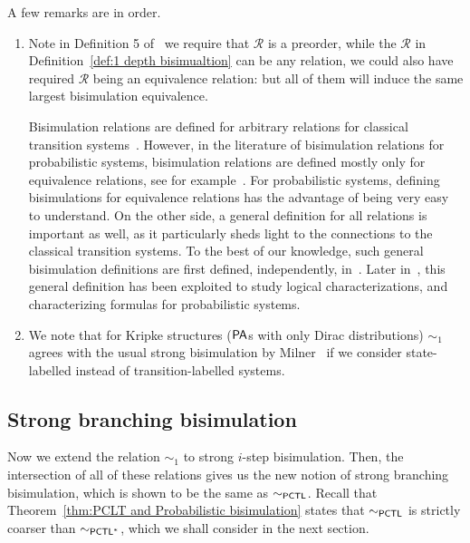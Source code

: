 \documentclass{LMCS}
\newcommand{\PA}{{\sf PA}}
\newcommand{\PCTL}{{\sf PCTL}}
\newcommand{\iBS}[1]{\sim_{#1}}
\newcommand{\EPCTL}{\sim_{\PCTL}}
\newcommand{\EPCTLS}{\sim_{\PCTL^{*}}}
\newcommand{\MC}[1]{\mathcal{#1}}
\begin{document}
\noindent A few remarks are in order.
\begin{enumerate}[(1)]
\item Note in Definition 5 of~\cite{SongZG2011} we require that $\MC{R}$ is a preorder, while the $\MC{R}$ in Definition~\ref{def:1 depth bisimualtion} can be any relation, we could also have required $\MC{R}$ being an equivalence relation: but all of them will induce the same largest bisimulation equivalence.

  Bisimulation relations are defined for arbitrary relations for
  classical transition
  systems~\cite{milner1989communication}. However, in the literature
  of bisimulation relations for probabilistic systems, bisimulation
  relations are defined mostly only for equivalence relations, see for
  example~\cite{LarsenS89,larsen1991bisimulation,Segala-thesis,baier2003comparative,SegalaL95,prakash-book}. For
  probabilistic systems, defining bisimulations for equivalence
  relations has the advantage of being very easy to understand. On
  the other side, a general definition for all relations is important
  as well, as it particularly sheds light to the connections to the
  classical transition systems. To the best of our knowledge, such
  general bisimulation definitions are first defined, independently,
  in~\cite{DesharnaisLT08,lpar08-yuxin-van-glabbeek,lijun-thesis}. Later
  in~\cite{Parma2007LCB,HermannsPSWZ11,SackZ12,Hennessy12}, this general definition
  has been exploited to study logical characterizations, and characterizing formulas 
  for probabilistic systems.
\item We note that for Kripke structures ($\PA$s with only Dirac
  distributions) $\iBS{1}$ agrees with the usual strong bisimulation
  by Milner~\cite{milner1989communication} if we consider
  state-labelled instead of transition-labelled systems.
\end{enumerate}
\subsection{Strong branching bisimulation}\label{sec:i depth bisimulation branching}
Now we extend the relation $\iBS{1}$ to strong $i$-step bisimulation. Then, the intersection of all of these relations gives us the new notion of strong branching bisimulation, which is shown to be the same as  $\EPCTL$. Recall that Theorem~\ref{thm:PCLT and Probabilistic bisimulation} states that  $\EPCTL$ is strictly coarser than $\EPCTLS$, which we shall consider in the next section.
\end{document}
